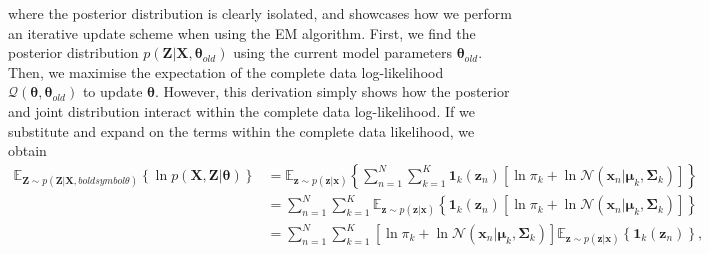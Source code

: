 \documentclass{article}
\begin{document}
where the posterior distribution is clearly isolated, and showcases how we perform an iterative update scheme when using the EM algorithm. First, we find the posterior distribution $p(\mathbf{Z}\vert\mathbf{X}, \boldsymbol\theta_{old})$ using the current model parameters $\boldsymbol\theta_{old}$. Then, we maximise the expectation of the complete data log-likelihood $\mathcal{Q}(\boldsymbol\theta, \boldsymbol\theta_{old})$ to update $\boldsymbol\theta$. However, this derivation simply shows how the posterior and joint distribution interact within the complete data log-likelihood. If we substitute and expand on the terms within the complete data likelihood, we obtain
\begin{equation}
\begin{aligned}
\mathbb{E}_{\mathbf{Z} \sim p(\mathbf{Z}\vert\mathbf{X}, boldsymbol\theta)} \left\lbrace \ln p(\mathbf{X}, \mathbf{Z} \vert \boldsymbol\theta) \right\rbrace &= \mathbb{E}_{\mathbf{z} \sim p(\mathbf{z}\vert\mathbf{x})} \left\lbrace \sum_{n=1}^{N} \sum_{k=1}^{K} \mathbf{1}_k(\mathbf{z}_n) \left[ \ln \pi_k + \ln \mathcal{N}(\mathbf{x}_n \vert \boldsymbol\mu_k, \boldsymbol\Sigma_k) \right] \right\rbrace \\
&= \sum_{n=1}^{N} \sum_{k=1}^{K} \mathbb{E}_{\mathbf{z} \sim p(\mathbf{z}\vert\mathbf{x})} \left\lbrace \mathbf{1}_k(\mathbf{z}_n) \left[ \ln \pi_k + \ln \mathcal{N}(\mathbf{x}_n \vert \boldsymbol\mu_k, \boldsymbol\Sigma_k) \right] \right\rbrace \\
&= \sum_{n=1}^{N} \sum_{k=1}^{K}  \left[ \ln \pi_k + \ln \mathcal{N}(\mathbf{x}_n \vert \boldsymbol\mu_k, \boldsymbol\Sigma_k) \right] \mathbb{E}_{\mathbf{z} \sim p(\mathbf{z}\vert\mathbf{x})} \left\lbrace \mathbf{1}_k(\mathbf{z}_n) \right\rbrace,
\end{aligned}
\end{equation}
\end{document}
